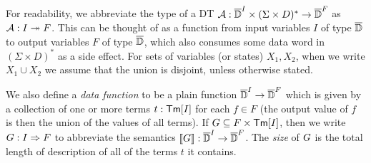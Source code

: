 For readability, we abbreviate the type of a DT
$\mathcal{A}: \overline{\mathbb{D}{}}^I \times (\Sigma \times D)^* \to \overline{\mathbb{D}{}}^F$ as $\mathcal{A}: I \twoheadrightarrow F$.
This can be thought of as a function from input variables $I$ of type $\overline{\mathbb{D}{}}$ to output variables $F$ of type $\overline{\mathbb{D}{}}$, which also consumes some data word in $(\Sigma \times D)^*$ as a side effect.
For sets of variables (or states) $X_1, X_2$, when we write $X_1 \cup X_2$ we assume that the union is disjoint, unless otherwise stated.

We also define a \emph{data function} to be a plain function $\overline{\mathbb{D}{}}^I \to \overline{\mathbb{D}{}}^F$ which is
given by a collection of one or more terms $t : \textsf{Tm}[I]$ for each $f \in F$ (the output value of $f$ is then the union of the values of all terms). If $G \subseteq F \times \textsf{Tm}[I]$, then we write $G: I \Rightarrow F$ to abbreviate the semantics $\llbracket G \rrbracket: \overline{\mathbb{D}{}}^I \to \overline{\mathbb{D}{}}^F$.
The \emph{size} of $G$ is the total length of description of all of the terms $t$ it contains.

